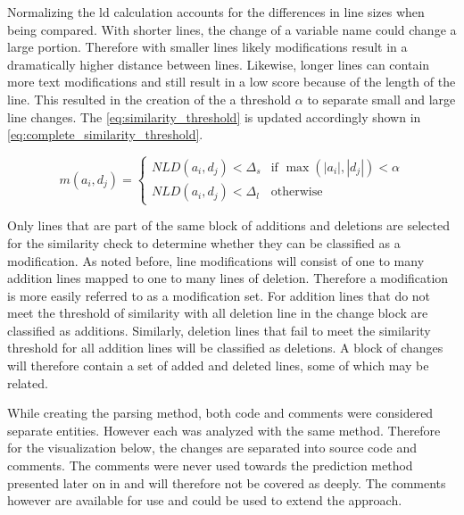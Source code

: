 Normalizing the \gls{ld} calculation accounts for the differences in line sizes when being compared. With shorter lines, the change of a variable name could change a large portion. Therefore with smaller lines likely modifications result in a dramatically higher distance between lines. Likewise, longer lines can contain more text modifications and still result in a low score because of the length of the line. This resulted in the creation of the a threshold $\alpha$ to separate small and large line changes. The \autoref{eq:similarity_threshold} is updated accordingly shown in \autoref{eq:complete_similarity_threshold}.

\begin{equation}
\label{eq:complete_similarity_threshold}
m(a_i, d_j) = \left\{\begin{matrix}
NLD(a_i, d_j) < \Delta_s & \text{if } \max(|a_i|, |d_j|) < \alpha \\ 
NLD(a_i, d_j) < \Delta_l & \text{otherwise}
\end{matrix}\right.
\end{equation}

Only lines that are part of the same block of additions and deletions are selected for the similarity check to determine whether they can be classified as a modification. As noted before, line modifications will consist of one to many addition lines mapped to one to many lines of deletion. Therefore a modification is more easily referred to as a modification set. For addition lines that do not meet the threshold of similarity with all deletion line in the change block are classified as additions. Similarly, deletion lines that fail to meet the similarity threshold for all addition lines will be classified as deletions. A block of changes will therefore contain a set of added and deleted lines, some of which may be related.

While creating the parsing method, both code and comments were considered separate entities. However each was analyzed with the same method. Therefore for the visualization below, the changes are separated into source code and comments. The comments were never used towards the prediction method presented later on in  and will therefore not be covered as deeply. The comments however are available for use and could be used to extend the approach.


